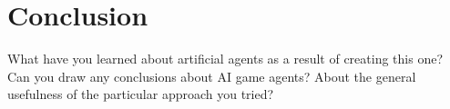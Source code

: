 \documentclass[12pt,info]{asg}
\begin{document}
\section{Conclusion}
What have you learned about artificial agents as a result of creating this one? Can you draw any conclusions about AI game agents? About the general usefulness of the particular approach you tried?


\end{document}
